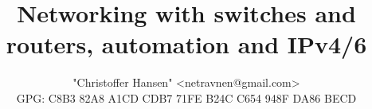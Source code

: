 \documentclass[a4paper,12pt,twoside,twocolumn,landscape]{book}
\title{Networking with switches and routers, automation and IPv4/6}
\author{"Christoffer Hansen" <netravnen@gmail.com>\\
    GPG: C8B3 82A8 A1CD CDB7 71FE  B24C C654 948F DA86 BECD}
\begin{document}

\tableofcontents

\setlength{\parskip}{0.35em} %
\renewcommand{\baselinestretch}{1.15} %
















\clearpage
\printglossary[type=\acronymtype,title=Special Terms,toctitle=List of terms]


\renewcommand{\listfigurename}{List of {\footnotesize hidden} Figures}
\listoffigures


\renewcommand{\listtablename}{Tables {\footnotesize hidding} on the pages}
\listoftables




\end{document}
